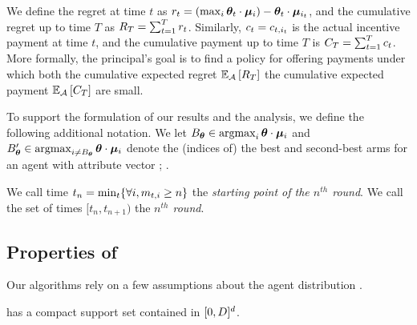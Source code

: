 We define the regret at time $t$ as
$r_{t} = (\max_{i} \bm{\theta}_{t} \cdot \bm{\mu}_{i}) - \bm{\theta}_{t} \cdot \bm{\mu}_{i_{t}}$,
and the cumulative regret up to time $T$ as
$R_{T} = \sum_{t=1}^{T} r_{t}$.
Similarly, $c_{t} = c_{t,i_{t}}$ is the actual incentive
payment at time $t$,
and the cumulative payment up to time $T$ is
$C_{T} = \sum_{t=1}^{T} c_{t}$.
More formally, the principal's goal is to find a policy
\POLICY for offering payments under which both the cumulative expected
regret
$\Expect[\POLICY]{\TotalRegret{T}}$ the cumulative expected payment
$\Expect[\POLICY]{\TotalPay{T}}$ are small.

To support the formulation of our results and the analysis,
we define the following additional notation.
We let
$B_{\bm{\theta}} \in \mathop{\mathrm{argmax}}_i \bm{\theta} \cdot \bm{\mu}_{i}$
and
$ B'_{\bm{\theta}} \in \mathop{\mathrm{argmax}}_{i \neq B_{\bm{\theta}}} \bm{\theta} \cdot \bm{\mu}_{i}$
denote the (indices of) the best and second-best arms for an agent
with attribute vector \AgV;
.

We call time $t_{n}=\min_{t}\{\forall i, m_{t,i} \geq n\}$ the
\emph{starting point of the $n^{th}$ round}.
We call the set of times $[t_{n}, t_{n+1})$ the
\emph{$n^{th}$ round}.




\subsection{Properties of \AgentDist}
Our algorithms rely on a few assumptions about the agent distribution
\AgentDist.

\begin{assumption} \label{A2}
\AgentDist has a compact support set contained in $[0,D]^d$.
\end{assumption}

